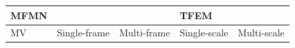 \begin{tabular}{lllll}
\toprule
MFMN &  &  & TFEM &  \\
\midrule
MV & Single-frame & Multi-frame & Single-scale & Multi-scale \\
\bottomrule
\end{tabular}
